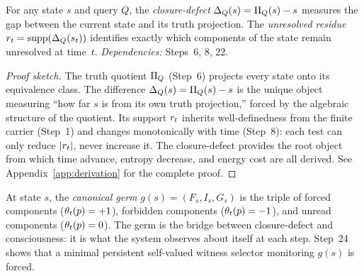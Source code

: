\begin{theorem}
\label{thm:closure-defect}
For any state $s$ and query $Q$, the \emph{closure-defect}
$\Delta_{Q}(s) = \Pi_Q(s) - s$ measures the gap between
the current state and its truth projection.  The \emph{unresolved residue}
$r_t = \mathrm{supp}(\Delta_{Q}(s_t))$ identifies exactly which
components of the state remain unresolved at time~$t$.
\emph{Dependencies:} Steps~6, 8, 22.
\begin{proof}[Proof sketch]
The truth quotient $\Pi_Q$ (Step~6) projects every state onto its
equivalence class.  The difference $\Delta_{Q}(s) = \Pi_Q(s) - s$
is the unique object measuring ``how far $s$ is from its own truth
projection,'' forced by the algebraic structure of the quotient.  Its
support $r_t$ inherits well-definedness from the finite carrier (Step~1)
and changes monotonically with time (Step~8): each test can only reduce
$|r_t|$, never increase it.  The closure-defect provides the root object
from which time advance, entropy decrease, and energy cost are all derived.
See Appendix~\ref{app:derivation} for the complete proof.
\end{proof}
\end{theorem}

\begin{remark}
\label{rem:canonical-germ}
At state $s$, the \emph{canonical germ} $g(s) = (F_s, I_s, G_s)$ is the
triple of forced components ($\theta_t(p)=+1$), forbidden components
($\theta_t(p)=-1$), and unread components ($\theta_t(p)=0$).  The
germ is the bridge between closure-defect and consciousness: it is what
the system observes about itself at each step.  Step~24 shows that a
minimal persistent self-valued witness selector monitoring $g(s)$ is forced.
\end{remark}

